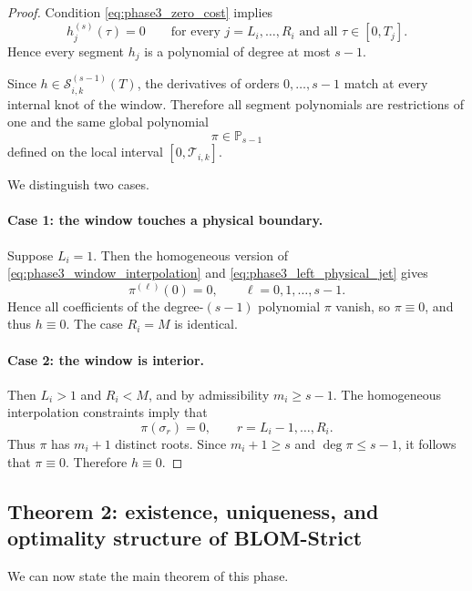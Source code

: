 \begin{proof}
Condition \eqref{eq:phase3_zero_cost} implies
\[
h_j^{(s)}(\tau)=0
\qquad
\text{for every } j=L_i,\dots,R_i \text{ and all } \tau\in[0,T_j].
\]
Hence every segment \(h_j\) is a polynomial of degree at most \(s-1\).

Since \(h\in \mathcal S_{i,k}^{(s-1)}(T)\), the derivatives of orders \(0,\dots,s-1\) match at every internal knot of the window.
Therefore all segment polynomials are restrictions of one and the same global polynomial
\[
\pi\in \mathbb P_{s-1}
\]
defined on the local interval \([0,\mathcal T_{i,k}]\).

We distinguish two cases.

\paragraph{Case 1: the window touches a physical boundary.}
Suppose \(L_i=1\).
Then the homogeneous version of \eqref{eq:phase3_window_interpolation} and \eqref{eq:phase3_left_physical_jet} gives
\[
\pi^{(\ell)}(0)=0,
\qquad
\ell=0,1,\dots,s-1.
\]
Hence all coefficients of the degree-\((s-1)\) polynomial \(\pi\) vanish, so \(\pi\equiv 0\), and thus \(h\equiv 0\).
The case \(R_i=M\) is identical.

\paragraph{Case 2: the window is interior.}
Then \(L_i>1\) and \(R_i<M\), and by admissibility \(m_i\ge s-1\).
The homogeneous interpolation constraints imply that
\[
\pi(\sigma_r)=0,
\qquad
r=L_i-1,\dots,R_i.
\]
Thus \(\pi\) has \(m_i+1\) distinct roots.
Since \(m_i+1\ge s\) and \(\deg \pi\le s-1\), it follows that \(\pi\equiv 0\).
Therefore \(h\equiv 0\).
\end{proof}

\subsection{Theorem 2: existence, uniqueness, and optimality structure of BLOM-Strict}
\label{subsec:phase3_theorem2}

We can now state the main theorem of this phase.

